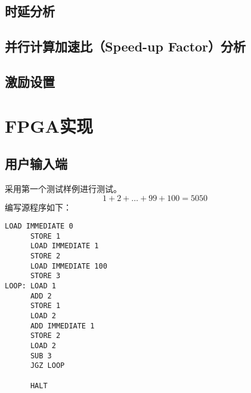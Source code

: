 \documentclass[lang=cn,a4paper,newtx]{elegantpaper}
\begin{document}
\subsection{时延分析}
\subsection{并行计算加速比（Speed-up Factor）分析}
\subsection{激励设置}

\section{FPGA实现}
\subsection{用户输入端}
采用第一个测试样例进行测试。
$$
1+2+\dots +99 +100 =5050
$$
编写源程序如下：
\begin{lstlisting}[language=Assembly]
      LOAD IMMEDIATE 0 
      STORE 1
      LOAD IMMEDIATE 1
      STORE 2
      LOAD IMMEDIATE 100
      STORE 3
LOOP: LOAD 1
      ADD 2
      STORE 1
      LOAD 2
      ADD IMMEDIATE 1
      STORE 2
      LOAD 2
      SUB 3
      JGZ LOOP

      HALT
\end{lstlisting}
\nocite{FPGA-CPU}
\end{document}
